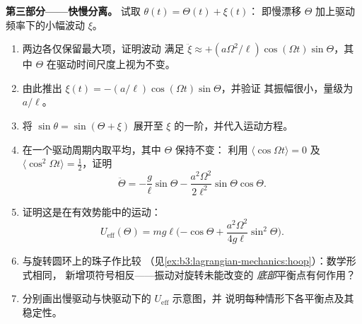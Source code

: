 \begin{problem}
\medskip\noindent\textbf{第三部分——快慢分离。}
试取 $\theta(t) = \Theta(t) + \xi(t)$：
即慢漂移 $\Theta$ 加上驱动频率下的小幅波动 $\xi$。
\begin{enumerate}[resume]
  \item 两边各仅保留最大项，证明波动
        满足 $\ddot\xi \approx +(a\Omega^2/\ell)\cos(\Omega t)
        \sin\Theta$，其中 $\Theta$ 在驱动时间尺度上视为不变。
  \item 由此推出 $\xi(t) = -(a/\ell)\cos(\Omega t)\sin\Theta$，并验证
        其振幅很小，量级为 $a/\ell$。
  \item 将 $\sin\theta = \sin(\Theta + \xi)$ 展开至
        $\xi$ 的一阶，并代入运动方程。
  \item 在一个驱动周期内取平均，其中 $\Theta$ 保持不变：
        利用 $\langle\cos\Omega t\rangle = 0$ 及
        $\langle\cos^2\Omega t\rangle = \tfrac12$，证明
        \[
        \ddot\Theta = -\frac{g}{\ell}\sin\Theta
         - \frac{a^2\Omega^2}{2\ell^2}\sin\Theta\cos\Theta .
        \]
  \item 证明这是在有效势能中的运动：
        \[
        U_{\text{eff}}(\Theta) = mg\ell\Big({-\cos\Theta}
         + \frac{a^2\Omega^2}{4g\ell}\sin^2\Theta\Big) .
        \]
  \item 与旋转圆环上的珠子作比较
        （见\cref{ex:b3:lagrangian-mechanics:hoop}）：数学形式相同，
        新增项符号相反——振动对旋转未能改变的
        \emph{底部}平衡点有何作用？
  \item 分别画出慢驱动与快驱动下的 $U_{\text{eff}}$ 示意图，并
        说明每种情形下各平衡点及其稳定性。
\end{enumerate}


\end{problem}
